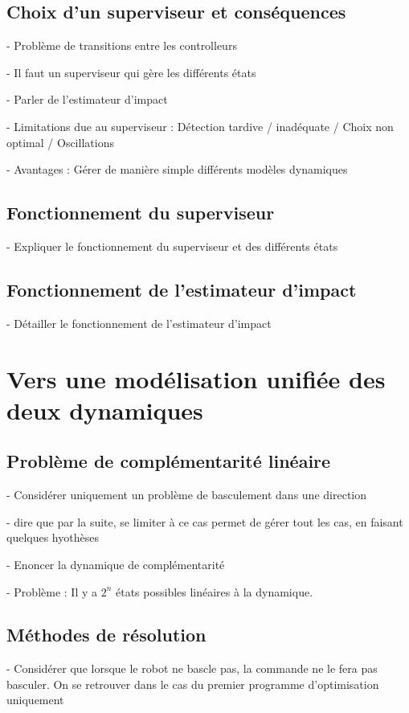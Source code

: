 		\subsection{Choix d'un superviseur et conséquences}

			- Problème de transitions entre les controlleurs

			- Il faut un superviseur qui gère les différents états

			- Parler de l'estimateur d'impact

			- Limitations due au superviseur : Détection tardive / inadéquate / Choix non optimal / Oscillations

			- Avantages : Gérer de manière simple différents modèles dynamiques

		\subsection{Fonctionnement du superviseur}

			- Expliquer le fonctionnement du superviseur et des différents états

		\subsection{Fonctionnement de l'estimateur d'impact}

			- Détailler le fonctionnement de l'estimateur d'impact

	\section{Vers une modélisation unifiée des deux dynamiques}
		\label{section.modelisation_unifiee}
		\subsection{Problème de complémentarité linéaire}

			- Considérer uniquement un problème de basculement dans une direction

			- dire que par la suite, se limiter à ce cas permet de gérer tout les cas, en faisant quelques hyothèses

			- Enoncer la dynamique de complémentarité

			- Problème : Il y a $2^n$ états possibles linéaires à la dynamique.

		\subsection{Méthodes de résolution}
				- Considérer que lorsque le robot ne bascle pas, la commande ne le fera pas basculer. On se retrouver dans le cas du premier programme d'optimisation uniquement

